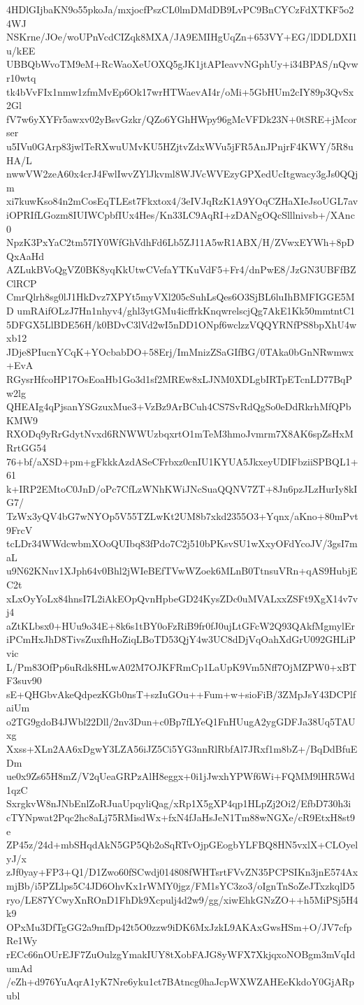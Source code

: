 4HDlGIjbaKN9o55pkoJa/mxjocfPszCL0lmDMdDB9LvPC9BnCYCzFdXTKF5o24WJ
NSKrne/JOe/woUPnVcdCIZqk8MXA/JA9EMIHgUqZn+653VY+EG/lDDLDXI1u/kEE
UBBQbWvoTM9eM+RcWaoXeUOXQ5gJK1jtAPIeavvNGphUy+i34BPAS/nQvwr10wtq
tk4bVvFIx1nmw1zfmMvEp6Ok17wrHTWaevAI4r/oMi+5GbHUm2cIY89p3QvSx2Gl
fV7w6yXYFr5awxv02yBsvGzkr/QZo6YGhHWpy96gMcVFDk23N+0tSRE+jMcorser
u5IVu0GArp83jwlTeRXwuUMvKU5HZjtvZdxWVu5jFR5AnJPnjrF4KWY/5R8uHA/L
nwwVW2zeA60x4crJ4FwlIwvZYlJkvml8WJVcWVEzyGPXedUcItgwacy3gJs0QQjm
xi7kuwKso84n2mCosEqTLEst7Fkxtox4/3eIVJqRzK1A9YOqCZHaXIeJsoUGL7av
iOPRIfLGozm8IUIWCpbfIUx4Hes/Kn33LC9AqRI+zDANgOQcSlllnivsb+/XAnc0
NpzK3PxYaC2tm57IY0WfGhVdhFd6Lb5ZJ11A5wR1ABX/H/ZVwxEYWh+8pDQxAaHd
AZLukBVoQgVZ0BK8yqKkUtwCVefaYTKuVdF5+Fr4/dnPwE8/JzGN3UBFfBZClRCP
CmrQlrh8sg0lJ1HkDvz7XPYt5myVXl205cSuhLsQes6O3SjBL6luIhBMFIGGE5MD
umRAifOLzJ7Hn1nhyv4/ghl3ytGMu4icffrkKnqwrelscjQg7AkE1Kk50mmtntC1
5DFGX5LlBDE56H/k0BDvC3lVd2wI5nDD1ONpf6wclzzVQQYRNfPS8bpXhU4wxb12
JDje8PIucnYCqK+YOcbabDO+58Erj/ImMnizZSaGIfBG/0TAka0bGnNRwmwx+EvA
RGysrHfcoHP17OsEoaHb1Go3d1sf2MREw8xLJNM0XDLgbIRTpETcnLD77BqPw2lg
QHEAIg4qPjsanYSGzuxMue3+VzBz9ArBCuh4CS7SvRdQgSo0eDdRkrhMfQPbKMW9
RXODq9yRrGdytNvxd6RNWWUzbqxrtO1mTeM3hmoJvmrm7X8AK6spZsHxMRrtGG54
76+bf/aXSD+pm+gFkkkAzdASeCFrbxz0cnIU1KYUA5JkxeyUDIFbziiSPBQL1+61
k+IRP2EMtoC0JnD/oPc7CfLzWNhKWiJNcSuaQQNV7ZT+8Jn6pzJLzHurIy8kIG7/
TzWx3yQV4bG7wNYOp5V55TZLwKt2UM8b7xkd2355O3+Yqnx/aKno+80mPvt9FrcV
tcLDr34WWdcwbmXOoQUIbq83fPdo7C2j510bPKsvSU1wXxyOFdYcoJV/3gsI7maL
u9N62KNnv1XJph64v0Bhl2jWIeBEfTVwWZoek6MLnB0TtnsuVRn+qAS9HubjEC2t
xLxOyYoLx84hnsI7L2iAkEOpQvnHpbeGD24KysZDc0uMVALxxZSFt9XgX14v7vj4
aZtKLbsx0+HUu9o34E+8k6s1tBY0oFzRiB9fr0fJ0ujLtGFcW2Q93QAkfMgmylEr
iPCmHxJhD8TivsZuxfhHoZiqLBoTD53QjY4w3UC8dDjVqOahXdGrU092GHLiPvic
L/Pm83OfPp6uRdk8HLwA02M7OJKFRmCp1LaUpK9Vm5Nff7OjMZPW0+xBTF3suv90
sE+QHGbvAkeQdpezKGb0nsT+szIuGOu++Fum+w+sioFiB/3ZMpJsY43DCPlfaiUm
o2TG9gdoB4JWbl22Dll/2nv3Dun+c0Bp7fLYeQ1FnHUugA2ygGDFJa38Uq5TAUxg
Xxss+XLn2AA6xDgwY3LZA56iJZ5Ci5YG3nnRlRbfAl7JRxf1m8bZ+/BqDdBfuEDm
ue0x9Zs65H8mZ/V2qUeaGRPzAlH8eggx+0i1jJwxhYPWf6Wi+FQMM9lHR5Wd1qzC
SxrgkvW8nJNbEnlZoRJuaUpqyliQag/xRp1X5gXP4qp1HLpZj2Oi2/EfbD730h3i
cTYNpwat2Pqc2hc8aLj75RMisdWx+fxN4fJaHsJeN1Tm88wNGXe/cR9EtxH8st9e
ZP45z/24d+mbSHqdAkN5GP5Qb2oSqRTvOjpGEogbYLFBQ8HN5vxlX+CLOyelyJ/x
zJf0yay+FP3+Q1/D1Zwo60fSCwdj014808fWHTsrtFVvZN35PCPSIKn3jnE574Ax
mjBb/i5PZLlps5C4JD6OhvKx1rWMY0jgz/FM1sYC3zo3/oIgnTnSoZeJTxzkqlD5
ryo/LE87YCwyXnROnD1FhDk9Xcpulj4d2w9/gg/xiwEhkGNzZO++h5MiPSj5H4k9
OPxMu3DfTgGG2a9mfDp42t5O0zzw9iDK6MxJzkL9AKAxGwsHSm+O/JV7cfpRe1Wy
rECc66nOUrEJF7ZuOulzgYmakIUY8tXobFAJG8yWFX7XkjqxoNOBgm3mVqIdumAd
/eZh+d976YuAqrA1yK7Nre6yku1ct7BAtncg0haJcpWXWZAHEeKkdoY0GjARpubl
